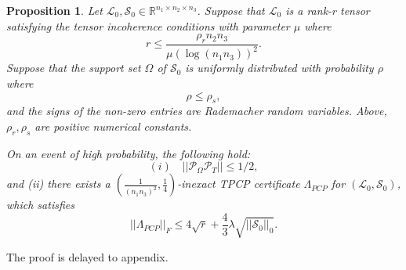 \documentclass[journal,transmag]{IEEEtran}
\newtheorem{proposition}{Proposition}[section]
\theoremstyle{plain}
\begin{document}
\begin{proposition}  \label{prop}
Let $\mathcal{L}_0, \mathcal{S}_0 \in \mathbb{R}^{n_1 \times n_2 \times n_3}$. Suppose that $\mathcal{L}_0$ is a rank-r tensor satisfying the tensor incoherence conditions with parameter $\mu$  where
\begin{equation} \label{rank}
{r \le \frac{\rho_r n_2 n_3}{\mu (\log(n_1 n_3))^2} }.
\end{equation}
Suppose that the support set $\Omega$ of $\mathcal{S}_0$ is uniformly distributed with probability $\rho$ where
\begin{equation}
{\rho \le \rho_s },
\end{equation}
and the signs of the non-zero entries are Rademacher random variables.
Above, $\rho_r, \rho_s$ are positive numerical constants.

 On an event of high probability, the following hold:
\[(i) \quad || \mathcal{P}_{\Omega} \mathcal{P}_T || \le 1/2, \]
and (ii) there exists a $ (\frac{1}{(n_1 n_3)^2}, \frac{1}{4})$-inexact TPCP certificate $\Lambda_{PCP}$ for $(\mathcal{L}_0, \mathcal{S}_0)$,
which satisfies
\begin{equation}
||\Lambda_{PCP}||_F \le 4\sqrt{r} + \frac{4}{3}\lambda \sqrt{||\mathcal{S}_0||_0}.
\end{equation}
\end{proposition}
The proof is delayed to appendix.
\end{document}
